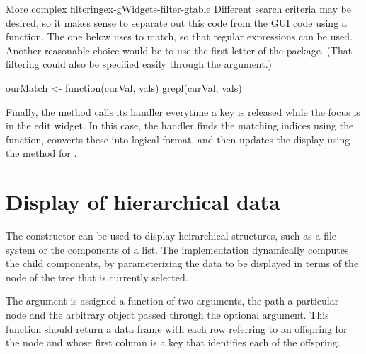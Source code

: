 \begin{example}{More complex filtering}{ex-gWidgets-filter-gtable}
Different search criteria may be desired, so it makes sense to
separate out this code from the GUI code using a function. The one below
uses  to match, so that regular expressions can be
used. Another reasonable choice would be to use the first letter of
the package. (That filtering could also be specified easily through the
 argument.)

\begin{Schunk}
\begin{Sinput}
 ourMatch <- function(curVal, vals) {
   grepl(curVal, vals)
 }
\end{Sinput}
\end{Schunk}

Finally, the  method calls its handler
everytime a key is released while the focus is in the edit widget. In
this case, the handler finds the matching indices using the
 function, converts these into logical format, and then
updates the display using the  method for
  .
\begin{Schunk}
\end{Schunk}
\end{example}


\section{Display of hierarchical data}
\label{sec:gWidgets-displ-heir-data}

The  constructor can be used to display
heirarchical structures, such as a file system or the components of a
list. The  implementation dynamically computes the
child components, by parameterizing the data to be displayed in terms
of the node of the tree that is currently selected. 

The  argument is assigned a function of two
arguments, the path a particular node and the arbitrary object passed
through the optional  argument. This
function should return a data frame with each row referring to an
offspring for the node and whose first column is a key that identifies
each of the offspring.

